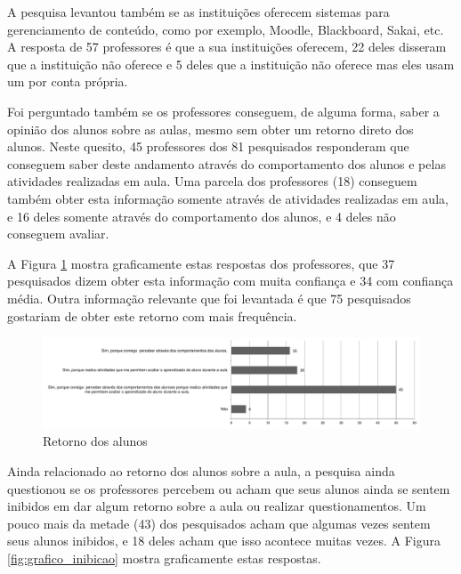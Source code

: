 A pesquisa levantou também se as instituições oferecem sistemas para gerenciamento de conteúdo, como por exemplo, Moodle, Blackboard, Sakai, etc. A resposta de 57 professores é que a sua instituições oferecem, 22 deles disseram que a instituição não oferece e 5 deles que a instituição não oferece mas eles usam um por conta própria. 




Foi perguntado também se os professores conseguem, de alguma forma, saber a opinião dos alunos sobre as aulas, mesmo sem obter um retorno direto dos alunos. Neste quesito, 45 professores dos 81 pesquisados responderam que conseguem saber deste andamento através do comportamento dos alunos e pelas atividades realizadas em aula. Uma parcela dos professores (18) conseguem também obter esta informação somente através de atividades realizadas em aula, e 16 deles somente através do comportamento dos alunos, e 4 deles não conseguem avaliar.

A Figura \ref{fig:grafico_retorno} mostra graficamente estas respostas dos professores, que 37 pesquisados dizem obter esta informação com muita confiança e 34 com confiança média. Outra informação relevante que foi levantada é que 75 pesquisados gostariam de obter este retorno com mais frequência.

\begin{figure}[!h]
\centering
\includegraphics[width=1.0\textwidth]{pdfs/alunos-professores/pesquisa-retorno-alunos.pdf} 
\caption{Retorno dos alunos}
\label{fig:grafico_retorno} 
\end{figure}

Ainda relacionado ao retorno dos alunos sobre a aula, a pesquisa ainda questionou se os professores percebem ou acham que seus alunos ainda se sentem inibidos em dar algum retorno sobre a aula ou realizar questionamentos. Um pouco mais da metade (43) dos pesquisados acham que algumas vezes sentem seus alunos inibidos, e 18 deles acham que isso acontece muitas vezes. A Figura \ref{fig:grafico_inibicao} mostra graficamente estas respostas.

